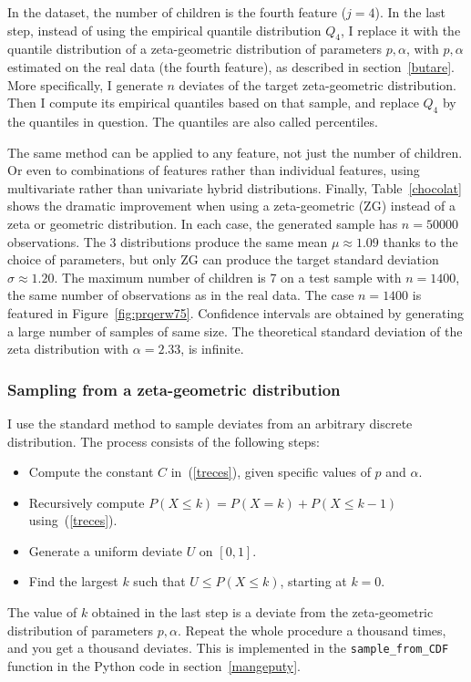 \documentclass[oneside,10pt]{book}
\begin{document}
In the dataset, the number of children is the fourth feature ($j=4$). In the last step, instead of using the empirical quantile distribution $Q_4$, 
 I replace it with the quantile distribution of a zeta-geometric distribution of parameters $p,\alpha$, with $p,\alpha$ estimated on the real data (the fourth feature), as described in section~\ref{butare}. More specifically, I generate $n$ deviates of the
 target zeta-geometric distribution. Then I compute its empirical quantiles based on that sample, and replace $Q_4$ by the quantiles in question. The quantiles are also called percentiles.

The same method can be applied to any feature, not just the number of children. Or even to combinations of features rather than individual features, using multivariate rather than univariate hybrid distributions. Finally, Table~\ref{chocolat} shows the dramatic improvement when using
 a zeta-geometric (ZG) instead of a zeta or geometric distribution. In each case, the generated sample has $n =\num{50000}$ observations.
 The 3 distributions produce the same mean $\mu\approx 1.09$ thanks to the choice of parameters, but only ZG can produce 
the target standard deviation $\sigma\approx 1.20$. The maximum number of children is 7 on a test sample with $n=1400$, the same number 
 of observations as in the real data. The case $n=1400$ is featured in Figure~\ref{fig:prqerw75}. Confidence intervals are obtained by generating a large number of samples of same size. The theoretical standard deviation of the zeta distribution with $\alpha = 2.33$, is infinite.  


\subsubsection{Sampling from a zeta-geometric distribution}

I use the standard method to sample deviates from an arbitrary discrete distribution. The process consists of the following steps: \vspace{1ex}
\begin{itemize}
\item Compute the constant $C$ in~(\ref{treces}), given specific values of $p$ and $\alpha$. 
\item Recursively compute $P(X\leq k)= P(X=k)+P(X\leq k-1)$ using~(\ref{treces}).
\item Generate a uniform deviate $U$ on $[0, 1]$.
\item Find the largest $k$ such that $U\leq P(X\leq k)$, starting at $k=0$. 
\end{itemize}\vspace{1ex}
The value of $k$ obtained in the last step is a deviate from the zeta-geometric distribution of parameters $p,\alpha$. Repeat the whole
 procedure a thousand times, and you get a thousand deviates. This is implemented
 in the \texttt{sample\_from\_CDF} function in the Python code in section~\ref{mangeputy}.
\end{document}
